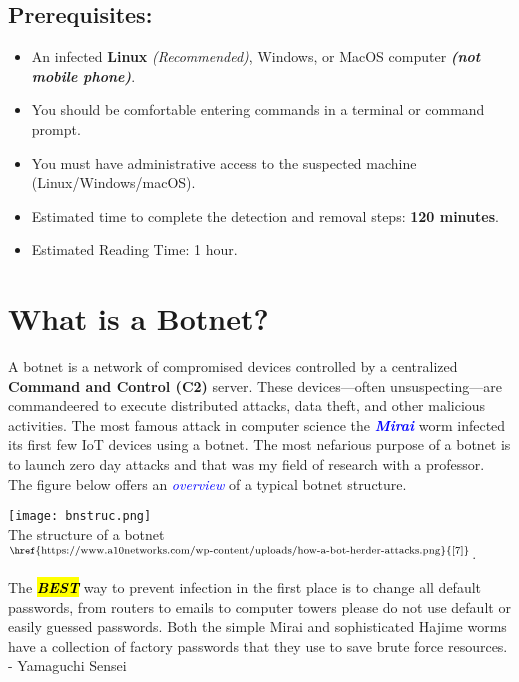 \documentclass{article}
\begin{document}
 \subsection*{Prerequisites:}
\begin{itemize}
    \item An infected \textbf{Linux} \textit{(Recommended)}, Windows, or MacOS computer \textbf{\textit{(not mobile phone)}}.
    \item You should be comfortable entering commands in a terminal or command prompt.
    \item You must have administrative access to the suspected machine (Linux/Windows/macOS).
    \item Estimated time to complete the detection and removal steps: \textbf{120 minutes}.
    \item Estimated Reading Time: 1 hour.
\end{itemize}

\section{What is a Botnet?}
\noindent A botnet is a network of compromised devices controlled by a centralized \textbf{Command and Control (C2)} server. These devices—often unsuspecting—are commandeered to execute distributed attacks, data theft, and other malicious activities. The most famous attack in computer science the \textbf{\textit{\textcolor{blue}{Mirai}}} worm infected its first few IoT devices using a botnet. The most nefarious purpose of a botnet is to launch zero day attacks and that was my field of research with a professor. The figure below offers an \textit{\textcolor{blue}{overview}} of a typical botnet structure.
\begin{tcolorbox}[
  colback=backcolour,
  colframe=blue!75!black,
  title={Botnet Structure},
  fonttitle=\bfseries\large\centering,
  arc=4mm,
  boxrule=1pt,
  left=10pt, right=10pt,
  top=10pt, bottom=10pt,
  enhanced
]
\centering
\texttt{[image: bnstruc.png]}\\[2mm]
The structure of a botnet$^{\text{\href{https://www.a10networks.com/wp-content/uploads/how-a-bot-herder-attacks.png}{[7]}}}$.
\end{tcolorbox}
\begin{tcolorbox}[
  colback=backcolour,
  colframe=red!100!black,
  title={\underline{Prevention Tip}},
  fonttitle=\bfseries\large\centering,
  arc=4mm,
  boxrule=1pt,
  left=10pt, right=10pt,
  top=10pt, bottom=10pt,
  enhanced
]
The \textbf{\textit{\hl{BEST}}} way to prevent infection in the first place is to change all default passwords, from routers to emails to computer towers please do not use default or easily guessed passwords. Both the simple Mirai and sophisticated Hajime worms have a collection of factory passwords that they use to save brute force resources.\\ \quad
- Yamaguchi Sensei
\end{tcolorbox}
\end{document}
